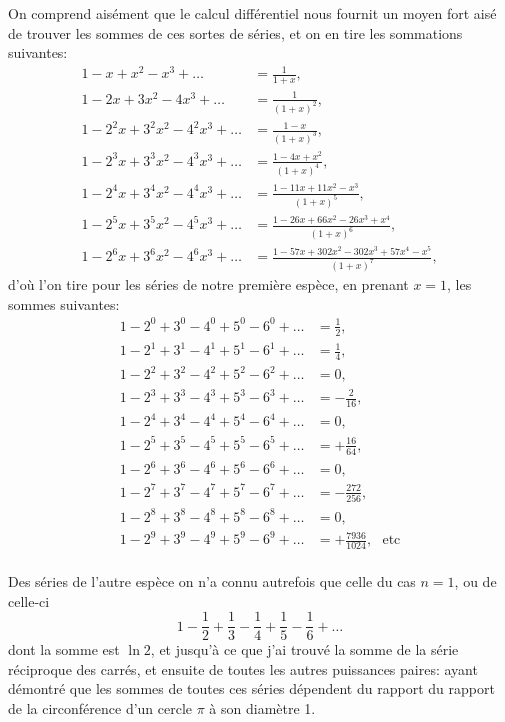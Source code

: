 \documentclass[12pt]{article}
\theoremstyle{definition}
\begin{document}
On comprend aisément que le calcul différentiel nous fournit un moyen fort aisé de trouver les sommes de ces sortes de séries, et on en tire les sommations suivantes:
\begin{align*}
    1 - x + x^2 - x^3 + \dots &= \frac{1}{1+x}, \\
    1 - 2x + 3x^2 - 4x^3 + \dots &= \frac{1}{(1+x)^2}, \\
    1 - 2^2x + 3^2x^2 - 4^2x^3 + \dots &= \frac{1-x}{(1+x)^3}, \\
    1 - 2^3x + 3^3x^2 - 4^3x^3 + \dots &= \frac{1-4x + x^2}{(1+x)^4}, \\
    1 - 2^4x + 3^4x^2 - 4^4x^3 + \dots &= \frac{1 - 11x + 11x^2 - x^3}{(1+x)^5}, \\
    1 - 2^5x + 3^5x^2 - 4^5x^3 + \dots &= \frac{1 - 26x + 66x^2 - 26x^3 + x^4}{(1+x)^6}, \\
    1 - 2^6x + 3^6x^2 - 4^6x^3 + \dots &= \frac{1 - 57x + 302x^2 - 302x^3 + 57x^4 - x^5}{(1+x)^7},
\end{align*}
d'où l'on tire pour les séries de notre première espèce, en prenant $x=1$, les sommes suivantes:
\begin{align*}
    1 - 2^0 + 3^0 - 4^0 + 5^0 - 6^0 + \dots &= \frac{1}{2}, \\
    1 - 2^1 + 3^1 - 4^1 + 5^1 - 6^1 + \dots &= \frac{1}{4}, \\
    1 - 2^2 + 3^2 - 4^2 + 5^2 - 6^2 + \dots &= 0, \\
    1 - 2^3 + 3^3 - 4^3 + 5^3 - 6^3 + \dots &= -\frac{2}{16}, \\
    1 - 2^4 + 3^4 - 4^4 + 5^4 - 6^4 + \dots &= 0, \\
    1 - 2^5 + 3^5 - 4^5 + 5^5 - 6^5 + \dots &= +\frac{16}{64}, \\
    1 - 2^6 + 3^6 - 4^6 + 5^6 - 6^6 + \dots &= 0, \\
    1 - 2^7 + 3^7 - 4^7 + 5^7 - 6^7 + \dots &= -\frac{272}{256}, \\
    1 - 2^8 + 3^8 - 4^8 + 5^8 - 6^8 + \dots &= 0, \\
    1 - 2^9 + 3^9 - 4^9 + 5^9 - 6^9 + \dots &= +\frac{7936}{1024}, \ \ \  \text{etc}\\
\end{align*}

Des séries de l'autre espèce on n'a connu autrefois que celle du cas $n=1$, ou de celle-ci
$$1 - \frac{1}{2} + \frac{1}{3} - \frac{1}{4} + \frac{1}{5} - \frac{1}{6} + \dots$$
dont la somme est $\ln 2$, et jusqu'à ce que j'ai trouvé la somme de la série réciproque des carrés, et ensuite de toutes les autres puissances paires: ayant démontré que les sommes de toutes ces séries dépendent du rapport du rapport de la circonférence d'un cercle $\pi$ à son diamètre 1.
\end{document}
